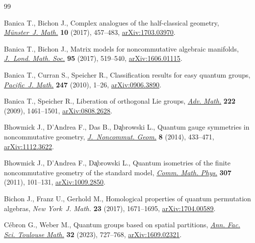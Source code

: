 \documentclass[10pt,a4paper]{amsart}
\numberwithin{equation}{section}
\let\OAoriginalcedilla\c
\renewcommand{\c}[1]{{\OAaccentfont\OAoriginalcedilla{#1}}}
\begin{document}
\begin{thebibliography}{99}
\footnotesize\itemsep=0pt

Banica T., Bichon J., Complex analogues of the half-classical geometry,
  \href{https://doi.org/10.17879/70299518811}{\textit{M\"unster~J. Math.}} \textbf{10} (2017), 457--483,
  \href{https://arxiv.org/abs/1703.03970}{arXiv:1703.03970}.

Banica T., Bichon J., Matrix models for noncommutative algebraic manifolds,
  \href{https://doi.org/10.1112/jlms.12020}{\textit{J.~Lond. Math. Soc.}} \textbf{95} (2017), 519--540,
  \href{https://arxiv.org/abs/1606.01115}{arXiv:1606.01115}.

Banica T., Curran S., Speicher R., Classification results for easy quantum
  groups, \href{https://doi.org/10.2140/pjm.2010.247.1}{\textit{Pacific~J. Math.}} \textbf{247} (2010), 1--26,
  \href{https://arxiv.org/abs/0906.3890}{arXiv:0906.3890}.

Banica T., Speicher R., Liberation of orthogonal {L}ie groups, \href{https://doi.org/10.1016/j.aim.2009.06.009}{\textit{Adv.
  Math.}} \textbf{222} (2009), 1461--1501, \href{https://arxiv.org/abs/0808.2628}{arXiv:0808.2628}.

Bhowmick J., D'Andrea F., Das B., D\c{a}browski L., Quantum gauge symmetries in
  noncommutative geometry, \href{https://doi.org/10.4171/JNCG/161}{\textit{J.~Noncommut. Geom.}} \textbf{8} (2014),
  433--471, \href{https://arxiv.org/abs/1112.3622}{arXiv:1112.3622}.

Bhowmick J., D'Andrea F., D\c{a}browski L., Quantum isometries of the finite
  noncommutative geometry of the standard model, \href{https://doi.org/10.1007/s00220-011-1301-2}{\textit{Comm. Math. Phys.}}
  \textbf{307} (2011), 101--131, \href{https://arxiv.org/abs/1009.2850}{arXiv:1009.2850}.

Bichon J., Franz U., Gerhold M., Homological properties of quantum permutation
  algebras, \textit{New York~J. Math.} \textbf{23} (2017), 1671--1695,
  \href{https://arxiv.org/abs/1704.00589}{arXiv:1704.00589}.

C\'ebron G., Weber M., Quantum groups based on spatial partitions, \href{https://doi.org/10.5802/afst.1750}{\textit{Ann.
  Fac. Sci. Toulouse Math.}} \textbf{32} (2023), 727--768, \href{https://arxiv.org/abs/1609.02321}{arXiv:1609.02321}.


\end{thebibliography}
\end{document}
